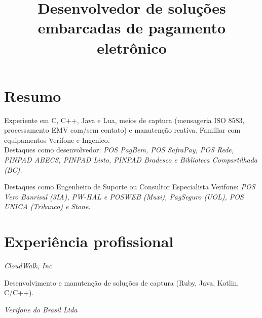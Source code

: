 \documentclass[11pt,a4paper,sans]{moderncv}
\title{\Large Desenvolvedor de soluções\protect\\embarcadas de pagamento eletrônico}
\begin{document}
\maketitle

\section{Resumo}

\vspace{0.5mm}

\hspace{1.25cm} Experiente em C, C++, Java e Lua, meios de captura (mensageria
ISO 8583, processamento EMV com/sem contato) e manutenção reativa. Familiar com
equipamentos Verifone e Ingenico.\protect\\

\hspace{1.25cm} Destaques como desenvolvedor: \textit{POS PagBem, POS SafraPay,
POS Rede, PINPAD ABECS, PINPAD Listo, PINPAD Bradesco e Biblioteca
Compartilhada (BC).}

\hspace{1.25cm} Destaques como Engenheiro de Suporte ou Consultor Especialista
Verifone: \textit{POS Vero Banrisul (3IA), PW-HAL e POSWEB (Muxi), PagSeguro
(UOL), POS UNICA (Tribanco) e Stone.}

\section{Experiência profissional}

\vspace{0.5mm}

\hspace{1.25cm} \textit{CloudWalk, Inc}


\hspace{1.25cm} \begin{minipage}[htb]{\linewidth - 1.25cm}
    Desenvolvimento e manutenção de soluções de captura (Ruby, Java, Kotlin,
    C/C++).
\end{minipage}

\vspace{\baselineskip}

\hspace{1.25cm} \textit{Verifone do Brasil Ltda}

\end{document}
